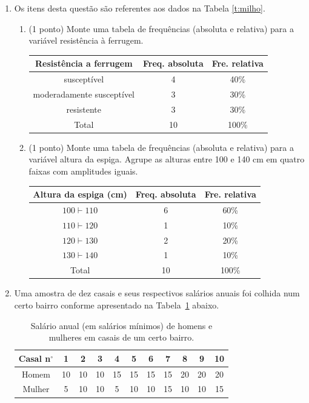 \documentclass{article}
\begin{document}
\begin{enumerate}
\item Os itens desta questão são referentes aos dados na Tabela \ref{t:milho}.
\begin{enumerate}
	\item (1 ponto) Monte uma tabela de frequências  (absoluta e relativa) para a variável resistência à ferrugem.\\
	{\color{blue}
	\begin{tabular}{c|cc}
	\hline
	Resistência a ferrugem & Freq. absoluta & Fre. relativa \\
	\hline
	susceptível & 4 & 40\% \\
	moderadamente susceptível & 3 & 30\% \\
	resistente & 3 & 30\% \\
	\hline
	Total & 10 & 100\% \\
	\hline
	\end{tabular}
	}
	
	\item (1 ponto) Monte uma tabela de frequências (absoluta e relativa) para a variável altura da espiga. Agrupe as alturas entre 100 e 140 cm em quatro faixas com amplitudes iguais.\\
	{\color{blue}
	\begin{tabular}{c|cc}
	\hline
	Altura da espiga (cm) & Freq. absoluta & Fre. relativa \\
	\hline
	$100 \vdash 110$ & 6 & 60\% \\
	$110 \vdash 120$ & 1 & 10\% \\
	$120 \vdash 130$ & 2 & 20\% \\
	$130 \vdash 140$ & 1 & 10\% \\
	\hline
	Total & 10 & 100\% \\
	\hline
	\end{tabular}	
	}
\end{enumerate}   


\item Uma amostra de dez casais e seus respectivos salários anuais foi colhida num certo bairro conforme apresentado na Tabela~\ref{t:salarios} abaixo.

\begin{table}[h]
	\centering
	\caption{Salário anual (em salários mínimos) de homens e mulheres em casais de um certo bairro.}
	\label{t:salarios}
\begin{tabular}{c|cccccccccc}
	\hline
	Casal n$^\circ$ & 1 & 2 & 3 & 4 & 5 & 6 & 7 & 8 & 9 & 10 \\
	\hline        
	Homem & 10 & 10 & 10 & 15 & 15 & 15 & 15 & 20 & 20 & 20 \\
	Mulher & 5 & 10 & 10 & 5 & 10 & 10 & 15 & 10 & 10 & 15 \\
	\hline
\end{tabular}	
\end{table}


\end{enumerate}
\end{document}
